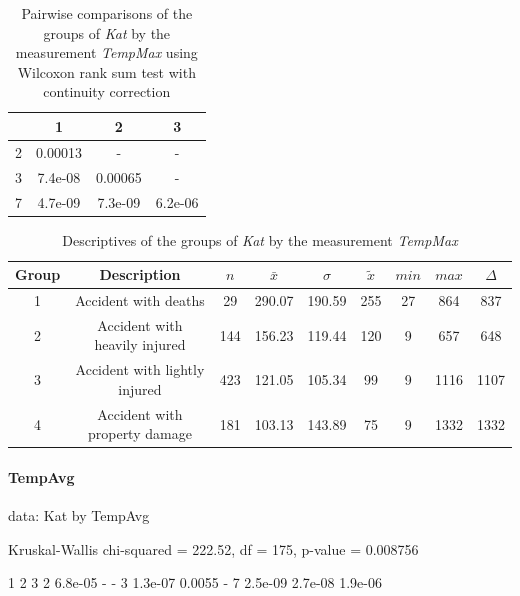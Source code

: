 \documentclass[a4paper,headsepline,footsepline,fontsize=11pt,BCOR=12mm,DIV=12]{report}
\begin{document}
\begin{table}[h]
	\centering
	\begin{tabular}{c|c|c|c}
		\toprule  
  		& 1 & 2 & 3 \\ 
  		\midrule    
		2 & 0.00013 & -       & -   \\   
		\midrule
		3 & 7.4e-08 & 0.00065 & -     \\ 
		\midrule
		7 & 4.7e-09 & 7.3e-09 & 6.2e-06 \\
 		\bottomrule
	\end{tabular}
	\caption{Pairwise comparisons of the groups of \textit{Kat} by the measurement \textit{TempMax} using Wilcoxon rank sum test with continuity correction}
\end{table}

\begin{table}[h]
	\centering
	\begin{tabular}{c|c|c|c|c|c|c|c|c}
		\toprule  
		Group & Description & $n$ & $\bar{x}$ & $\sigma$ & $\tilde{x}$ & $min$ & $max$ & $\Delta$ \\
		\midrule
		1 & Accident with deaths & 29 & 290.07 & 190.59 & 255 & 27 & 864 & 837 \\ 
 		2 & Accident with heavily injured & 144 & 156.23 & 119.44 & 120 & 9 & 657 & 648 \\
 		3 & Accident with lightly injured & 423 & 121.05 & 105.34 & 99 & 9 & 1116 & 1107 \\
 		4 & Accident with property damage & 181 & 103.13 & 143.89 & 75 & 9 & 1332 & 1332 \\ 
 		\bottomrule
	\end{tabular}
	\caption{Descriptives of the groups of \textit{Kat} by the measurement \textit{TempMax}}
\end{table}

\paragraph{TempAvg}
data:  Kat by TempAvg

Kruskal-Wallis chi-squared = 222.52, df = 175, p-value = 0.008756

  1       2       3      
2 6.8e-05 -       -      
3 1.3e-07 0.0055  -      
7 2.5e-09 2.7e-08 1.9e-06
\end{document}
